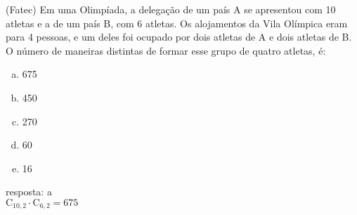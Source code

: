 \begin{ex}
(Fatec) Em uma Olimpíada, a delegação de um país A  se apresentou com 10 atletas e a de um país B, com 6 atletas. Os alojamentos da Vila Olímpica eram para 4 pessoas, e um deles foi ocupado por dois atletas de A e dois atletas de B. O número de maneiras distintas de formar esse grupo de quatro atletas, é:
   \begin{enumerate}[(a)]
   \item 675
   \item 450
   \item 270
   \item 60
   \item 16
   \end{enumerate}
     \begin{sol}
       resposta: a \\
       $\mathrm{C}_{{10},2}\cdot \mathrm{C}_{6,2}=675$
     \end{sol}
\end{ex}